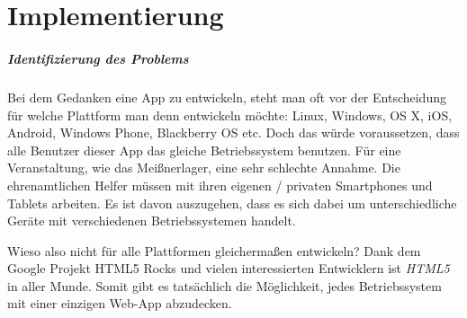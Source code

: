 \chapter{Implementierung}




\paragraph{Identifizierung des Problems}
Bei dem Gedanken eine App zu entwickeln, steht man oft vor der Entscheidung für welche Plattform man denn entwickeln möchte: Linux, Windows, OS X, iOS, Android, Windows Phone, Blackberry OS etc. Doch das würde voraussetzen, dass alle Benutzer dieser App das gleiche Betriebssystem benutzen. Für eine Veranstaltung, wie das Meißnerlager, eine sehr schlechte Annahme. Die ehrenamtlichen Helfer müssen mit ihren eigenen / privaten Smartphones und Tablets arbeiten. Es ist davon auszugehen, dass es sich dabei um unterschiedliche Geräte mit verschiedenen Betriebssystemen handelt.\par

Wieso also nicht für alle Plattformen gleichermaßen entwickeln? Dank dem Google Projekt \glqq HTML5 Rocks\grqq{}\cite{html5rocksmain} und vielen interessierten Entwicklern ist \emph{HTML5} in aller Munde. Somit gibt es tatsächlich die Möglichkeit, jedes Betriebssystem mit einer einzigen Web-App abzudecken.

